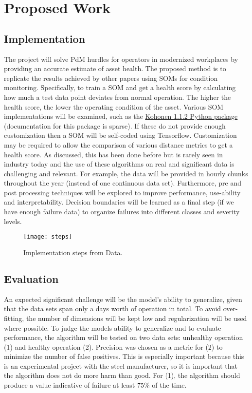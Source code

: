 \section{Proposed Work}
\subsection{Implementation}

The project will solve PdM hurdles for operators in modernized workplaces by providing an accurate estimate of asset health.
The proposed method is to replicate the results achieved by other papers using SOMs for condition monitoring. 
Specifically, to train a SOM and get a health score by calculating how much a test data point deviates from normal operation.
The higher the health score, the lower the operating condition of the asset.
Various SOM implementations will be examined, such as the \href{https://pypi.org/project/kohonen/}{Kohonen 1.1.2 Python package} (documentation for this package is sparse).
If these do not provide enough customization then a SOM will be self-coded using Tensorflow.
Customization may be required to allow the comparison of various distance metrics to get a health score.
As discussed, this has been done before but is rarely seen in industry today and the use of these algorithms on real and significant data is challenging and relevant.
For example, the data will be provided in hourly chunks throughout the year (instead of one continuous data set).
Furthermore, pre and post processing techniques will be explored to improve performance, use-ability and interpretability.
Decision boundaries will be learned as a final step (if we have enough failure data) to organize failures into different classes and severity levels.

\begin{figure}[!h]
    \texttt{[image: steps]}
    \centering
    \label{fig:steps}
    \caption{Implementation steps from Data.}
\end{figure}

\subsection{Evaluation}

An expected significant challenge will be the model's ability to generalize, given that the data sets span only a days worth of operation in total.
To avoid over-fitting, the number of dimensions will be kept low and regularization will be used where possible.
To judge the models ability to generalize and to evaluate performance, the algorithm will be tested on two data sets: unhealthy operation (1) and healthy operation (2).
Precision was chosen as a metric for (2) to minimize the number of false positives.
This is especially important because this is an experimental project with the steel manufacturer, so it is important that the algorithm does not do more harm than good.
For (1), the algorithm should produce a value indicative of failure at least 75\% of the time.


